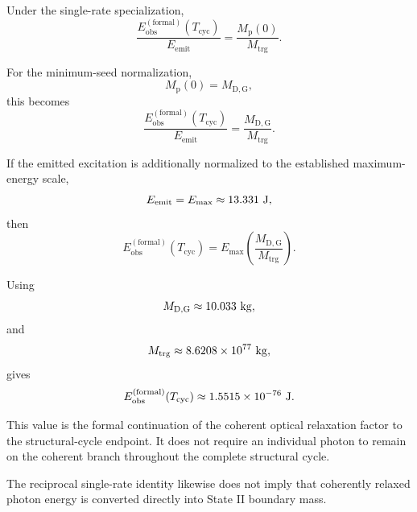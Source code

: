 Under the single-rate specialization,
\begin{equation}
    \boxed{
    \frac{
        E_{\mathrm{obs}}^{(\mathrm{formal})}
        (T_{\mathrm{cyc}})
    }{
        E_{\mathrm{emit}}
    }
    =
    \frac{
        M_{\mathrm p}(0)
    }{
        M_{\mathrm{trg}}
    }.
    }
    \label{eq:AU_endpoint_clock_single_rate}
\end{equation}

For the minimum-seed normalization,
\begin{equation}
    M_{\mathrm p}(0)
    =
    M_{\mathrm{D,G}},
\end{equation}
this becomes
\begin{equation}
    \frac{
        E_{\mathrm{obs}}^{(\mathrm{formal})}
        (T_{\mathrm{cyc}})
    }{
        E_{\mathrm{emit}}
    }
    =
    \frac{
        M_{\mathrm{D,G}}
    }{
        M_{\mathrm{trg}}
    }.
\end{equation}

If the emitted excitation is additionally normalized to the established
maximum-energy scale,
\begin{equation}
    E_{\mathrm{emit}}
    =
    E_{\mathrm{max}}
    \approx
    13.331
    \ {\rm J},
\end{equation}
then
\begin{equation}
    E_{\mathrm{obs}}^{(\mathrm{formal})}
    (T_{\mathrm{cyc}})
    =
    E_{\mathrm{max}}
    \left(
        \frac{
            M_{\mathrm{D,G}}
        }{
            M_{\mathrm{trg}}
        }
    \right).
\end{equation}

Using
\begin{equation}
    M_{\mathrm{D,G}}
    \approx
    10.033
    \ {\rm kg},
\end{equation}
and
\begin{equation}
    M_{\mathrm{trg}}
    \approx
    8.6208\times10^{77}
    \ {\rm kg},
\end{equation}
gives
\begin{equation}
    E_{\mathrm{obs}}^{(\mathrm{formal})}
    (T_{\mathrm{cyc}})
    \approx
    1.5515\times10^{-76}
    \ {\rm J}.
\end{equation}

This value is the formal continuation of the coherent optical relaxation
factor to the structural-cycle endpoint. It does not require an individual
photon to remain on the coherent branch throughout the complete structural
cycle.

The reciprocal single-rate identity likewise does not imply that coherently
relaxed photon energy is converted directly into State II boundary mass.

